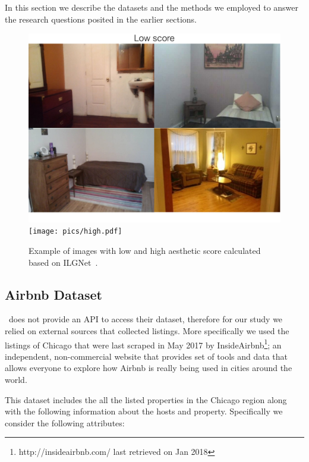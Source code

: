 
In this section we describe the datasets and the methods we employed to answer the research questions posited in the earlier sections. 
\begin{figure}[]
\begin{center}
\includegraphics[width=0.4\columnwidth]{pics/low.pdf}
\texttt{[image: pics/high.pdf]}
\caption{Example of images with  low and high  aesthetic score calculated based on ILGNet~\cite{ilgnet}.}
\label{fig:aesimages}
\end{center}
\end{figure}


\subsection{Airbnb Dataset}
\ab \ does not provide an API to access their dataset, therefore for our study we relied on external sources that collected listings. More specifically we used the listings of Chicago that were last  scraped in May 2017 by InsideAirbnb\footnote{http://insideairbnb.com/ last retrieved on Jan 2018 }; an independent, non-commercial website that provides set of tools and data that allows everyone to explore how Airbnb is really being used in cities around the world.

This dataset includes the all the listed properties in the Chicago region along with the  following  information about the hosts and property. Specifically we consider the following attributes: 

